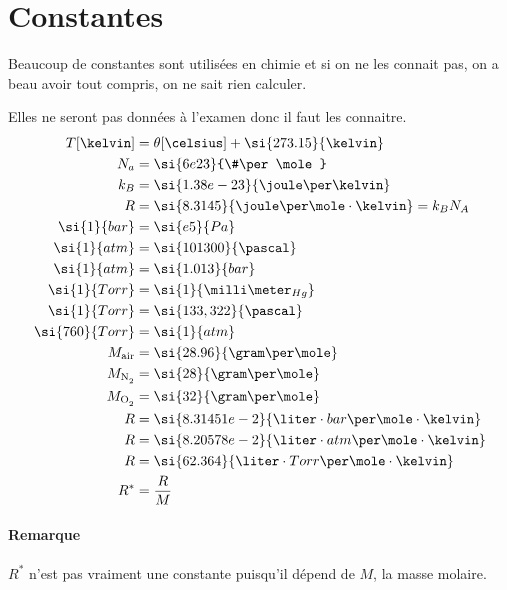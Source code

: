 \section{Constantes}
Beaucoup de constantes sont utilisées en chimie et si on ne les connait pas,
on a beau avoir tout compris, on ne sait rien calculer.

Elles ne seront pas données à l'examen donc il faut les connaitre.
\begin{align*}
  T[\kelvin] & = \theta[\celsius] + \si{273.15}{\kelvin}\\
  N_a & = \si{6e23}{\#\per\mole}\\
  k_B & = \si{1.38e-23}{\joule\per\kelvin}\\
  R & = \si{8.3145}{\joule\per\mole\cdot\kelvin} = k_B N_A\\
  \si{1}{bar} & = \si{e5}{Pa}\\
  \si{1}{atm} & = \si{101300}{\pascal}\\
  \si{1}{atm} & = \si{1.013}{bar}\\
  \si{1}{Torr} & = \si{1}{\milli\meter_{Hg}}\\
  \si{1}{Torr} & = \si{133,322}{\pascal}\\
  \si{760}{Torr} & = \si{1}{atm}\\
  M_\mathrm{air} & = \si{28.96}{\gram\per\mole}\\
  M_\mathrm{\ce{N2}} & = \si{28}{\gram\per\mole}\\
  M_\mathrm{\ce{O2}} & = \si{32}{\gram\per\mole}\\
  R & = \si{8.31451e-2}{\liter\cdot bar\per\mole\cdot\kelvin}\\
  R & = \si{8.20578e-2}{\liter\cdot atm\per\mole\cdot\kelvin}\\
  R & = \si{62.364}{\liter\cdot Torr\per\mole\cdot\kelvin}\\
  R^* & = \frac{R}{M}
\end{align*}

\paragraph{Remarque}
$R^*$ n'est pas vraiment une constante puisqu'il dépend de $M$,
la masse molaire.



